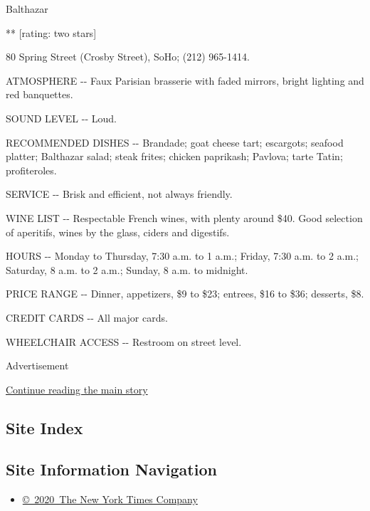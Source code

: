 Balthazar

** {[}rating: two stars{]}

80 Spring Street (Crosby Street), SoHo; (212) 965-1414.

ATMOSPHERE -\/- Faux Parisian brasserie with faded mirrors, bright
lighting and red banquettes.

SOUND LEVEL -\/- Loud.

RECOMMENDED DISHES -\/- Brandade; goat cheese tart; escargots; seafood
platter; Balthazar salad; steak frites; chicken paprikash; Pavlova;
tarte Tatin; profiteroles.

SERVICE -\/- Brisk and efficient, not always friendly.

WINE LIST -\/- Respectable French wines, with plenty around \$40. Good
selection of aperitifs, wines by the glass, ciders and digestifs.

HOURS -\/- Monday to Thursday, 7:30 a.m. to 1 a.m.; Friday, 7:30 a.m. to
2 a.m.; Saturday, 8 a.m. to 2 a.m.; Sunday, 8 a.m. to midnight.

PRICE RANGE -\/- Dinner, appetizers, \$9 to \$23; entrees, \$16 to \$36;
desserts, \$8.

CREDIT CARDS -\/- All major cards.

WHEELCHAIR ACCESS -\/- Restroom on street level.

Advertisement

\protect\hyperlink{after-bottom}{Continue reading the main story}

\hypertarget{site-index}{%
\subsection{Site Index}\label{site-index}}

\hypertarget{site-information-navigation}{%
\subsection{Site Information
Navigation}\label{site-information-navigation}}

\begin{itemize}
\tightlist
\item
  \href{https://help.nytimes3xbfgragh.onion/hc/en-us/articles/115014792127-Copyright-notice}{©~2020~The
  New York Times Company}
\end{itemize}

